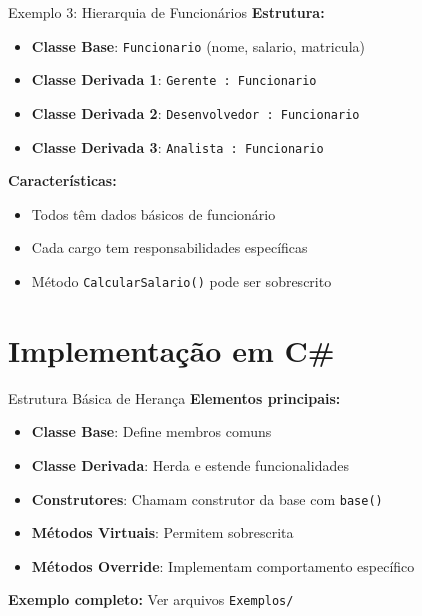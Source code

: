 \documentclass[aspectratio=169]{beamer}
\begin{document}
\begin{frame}{Exemplo 3: Hierarquia de Funcionários}
\textbf{Estrutura:}
\begin{itemize}
\item \textbf{Classe Base}: \texttt{Funcionario} (nome, salario, matricula)
\item \textbf{Classe Derivada 1}: \texttt{Gerente : Funcionario}
\item \textbf{Classe Derivada 2}: \texttt{Desenvolvedor : Funcionario}
\item \textbf{Classe Derivada 3}: \texttt{Analista : Funcionario}
\end{itemize}

\vspace{0.3cm}
\textbf{Características:}
\begin{itemize}
\item Todos têm dados básicos de funcionário
\item Cada cargo tem responsabilidades específicas
\item Método \texttt{CalcularSalario()} pode ser sobrescrito
\end{itemize}
\end{frame}

\section{Implementação em C\#}

\begin{frame}{Estrutura Básica de Herança}
\textbf{Elementos principais:}
\begin{itemize}
\item \textbf{Classe Base}: Define membros comuns
\item \textbf{Classe Derivada}: Herda e estende funcionalidades
\item \textbf{Construtores}: Chamam construtor da base com \texttt{base()}
\item \textbf{Métodos Virtuais}: Permitem sobrescrita
\item \textbf{Métodos Override}: Implementam comportamento específico
\end{itemize}

\vspace{0.3cm}
\textbf{Exemplo completo:} Ver arquivos \texttt{Exemplos/}
\end{frame}
\end{document}
